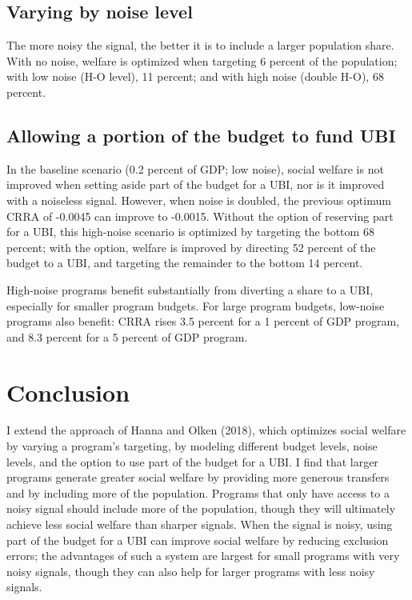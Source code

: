 \documentclass[12pt]{article}
\begin{document}
\subsection{Varying by noise level} \label{varying_by_noise}

The more noisy the signal, the better it is to include a larger population 
share. With no noise, welfare is optimized when targeting 6 percent of the 
population; with low noise (H-O level), 11 percent; and with high noise (double 
H-O), 68 percent.


\subsection{Allowing a portion of the budget to fund UBI} \label{ubi_portion}

In the baseline scenario (0.2 percent of GDP; low noise), social welfare is not 
improved when setting aside part of the budget for a UBI, nor is it improved 
with a noiseless signal. However, when noise is doubled, the previous optimum 
CRRA of -0.0045 can improve to -0.0015. Without the option of reserving part 
for a UBI, this high-noise scenario is optimized by targeting the bottom 68 
percent; with the option, welfare is improved by directing 52 percent of the 
budget to a UBI, and targeting the remainder to the bottom 14 percent.

High-noise programs benefit substantially from diverting a share to a UBI, 
especially for smaller program budgets. For large program budgets, low-noise 
programs also benefit: CRRA rises 3.5 percent for a 1 percent of GDP program, 
and 8.3 percent for a 5 percent of GDP program.


\section{Conclusion} \label{sec:conclusion}

I extend the approach of Hanna and Olken (2018), which optimizes social welfare 
by varying a program's targeting, by modeling different budget levels, noise 
levels, and the option to use part of the budget for a UBI. I find that larger 
programs generate greater social welfare by providing more generous transfers 
and by including more of the population. Programs that only have access to a 
noisy signal should include more of the population, though they will ultimately 
achieve less social welfare than sharper signals. When the signal is noisy, 
using part of the budget for a UBI can improve social welfare by reducing 
exclusion errors; the advantages of such a system are largest for small 
programs with very noisy signals, though they can also help for larger programs 
with less noisy signals.
\end{document}
